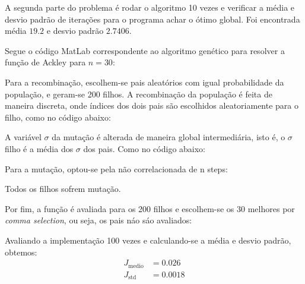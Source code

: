 \documentclass[12pt]{article}
\newenvironment{exercise}[2][Exercício]{\begin{trivlist}
\item[\hskip \labelsep {\bfseries #1}\hskip \labelsep {\bfseries #2.}]}{\end{trivlist}}
\begin{document}
\begin{exercise}{2}
A segunda parte do problema é rodar o algoritmo 10 vezes e verificar a média e
desvio padrão de iterações para o programa achar o ótimo global. Foi encontrada
média $19.2$ e desvio padrão $2.7406$.

\end{exercise}

\begin{exercise}{3}
Segue o código MatLab correspondente ao algoritmo genético para resolver a
função de Ackley para $n=30$:


Para a recombinação, escolhem-se pais aleatórios com igual probabilidade da
população, e geram-se 200 filhos. A recombinação da população é feita de maneira
discreta, onde índices dos dois pais são escolhidos aleatoriamente para o filho,
como no código abaixo:


A variável $\sigma$ da mutação é alterada de maneira global intermediária, isto
é, o $\sigma$ filho é a média dos $\sigma$ dos pais. Como no código abaixo: 


Para a mutação, optou-se pela não correlacionada de n steps:

Todos os filhos sofrem mutação.

Por fim, a função é avaliada para os 200 filhos e escolhem-se os 30 melhores
por \textit{comma selection}, ou seja, os pais náo sáo avaliados:



Avaliando a implementação 100 vezes e calculando-se a média e desvio padrão,
obtemos:
\begin{align*}
J_{\text{medio}} &= 0.026 \\
J_{\text{std}} &= 0.0018 
\end{align*}
\end{exercise}
\end{document}
